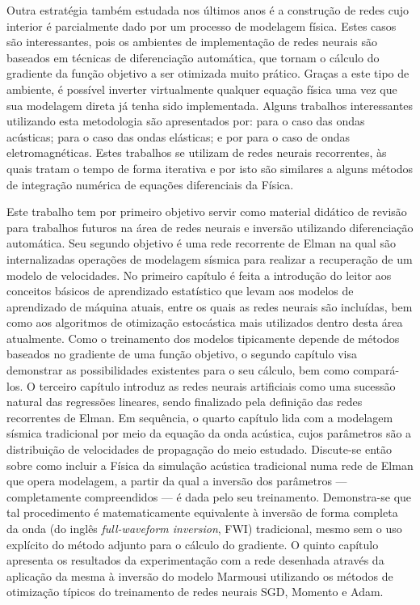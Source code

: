   Outra estratégia também estudada nos últimos anos é a construção de redes cujo interior é parcialmente dado por um processo de modelagem física. Estes casos são interessantes, pois os ambientes de implementação de redes neurais são baseados em técnicas de diferenciação automática, que tornam o cálculo do gradiente da função objetivo a ser otimizada muito prático. Graças a este tipo de ambiente, é possível inverter virtualmente qualquer equação física uma vez que sua modelagem direta já tenha sido implementada. Alguns trabalhos interessantes utilizando esta metodologia são apresentados por:  para o caso das ondas acústicas;  para o caso das ondas elásticas; e por  para o caso de ondas eletromagnéticas. Estes trabalhos se utilizam de redes neurais recorrentes, às quais tratam o tempo de forma iterativa e por isto são similares a alguns métodos de integração numérica de equações diferenciais da Física.

  Este trabalho tem por primeiro objetivo servir como material didático de revisão para trabalhos futuros na área de redes neurais e inversão utilizando diferenciação automática. Seu segundo objetivo é \DIFdelbegin {}\DIFdelend \DIFaddbegin {}\DIFaddend uma rede recorrente de Elman na qual são internalizadas operações de modelagem sísmica para realizar a recuperação de um modelo de velocidades. No primeiro capítulo é feita a introdução do leitor aos conceitos básicos de aprendizado estatístico que levam aos modelos de aprendizado de máquina atuais, entre os quais as redes neurais são incluídas, bem como aos algoritmos de otimização estocástica mais utilizados dentro desta área atualmente. Como o treinamento dos modelos tipicamente depende de métodos baseados no gradiente de uma função objetivo, o segundo capítulo visa demonstrar as possibilidades existentes para o seu cálculo, bem como compará-los. O terceiro capítulo introduz as redes neurais artificiais como uma sucessão natural das regressões lineares, sendo finalizado pela definição das redes recorrentes de Elman. Em sequência, o quarto capítulo lida com a modelagem sísmica tradicional por meio da equação da onda acústica, cujos parâmetros são a distribuição de velocidades de propagação do meio estudado. Discute-se então sobre como incluir a Física da simulação acústica tradicional numa rede de Elman que opera modelagem, a partir da qual a inversão dos parâmetros --- completamente compreendidos --- é dada pelo seu treinamento. Demonstra-se que tal procedimento é matematicamente equivalente à inversão de forma completa da onda (do inglês \textit{full-waveform inversion}, FWI) tradicional, mesmo sem o uso explícito do método adjunto para o cálculo do gradiente. O quinto capítulo apresenta os resultados da experimentação com a rede desenhada através da aplicação da mesma à inversão do modelo Marmousi  utilizando os métodos de otimização típicos do treinamento de redes neurais SGD, Momento e Adam.
